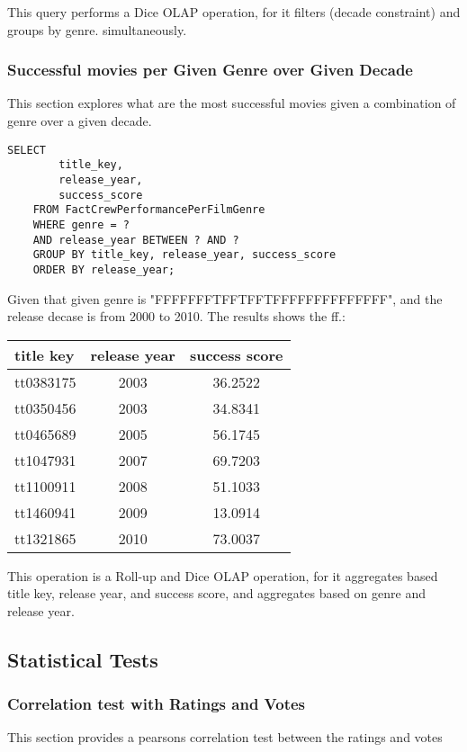 This query performs a Dice OLAP operation, for it filters (decade constraint) and groups by genre. simultaneously.

\subsubsection{Successful movies per Given Genre over Given Decade}

This section explores what are the most successful movies given a combination of genre over a given decade.

\begin{lstlisting}[style=SQLStyle]
	SELECT
		title_key,
		release_year,
		success_score
	FROM FactCrewPerformancePerFilmGenre
	WHERE genre = ?
	AND release_year BETWEEN ? AND ?
	GROUP BY title_key, release_year, success_score
	ORDER BY release_year;
\end{lstlisting}

Given that given genre is "FFFFFFFTFFTFFTFFFFFFFFFFFFFF", and the release decase is from 2000 to 2010. The results shows the ff.:

\begin{center}
\begin{tabular}{|p{4cm}|c|c|}
\hline
title key & release year & success score\\
\hline
tt0383175 & 2003 & 36.2522\\
tt0350456 & 2003 & 34.8341\\
tt0465689 & 2005 & 56.1745\\
tt1047931 & 2007 & 69.7203\\
tt1100911 & 2008 & 51.1033\\
tt1460941 & 2009 & 13.0914\\
tt1321865 & 2010 & 73.0037\\
\hline
\end{tabular}
\end{center}

This operation is a Roll-up and Dice OLAP operation, for it aggregates based title key, release year, and success score, and aggregates based on genre and release year.

\subsection{Statistical Tests}
\subsubsection{Correlation test with Ratings and Votes}
This section provides a pearsons correlation test between the ratings and votes 


